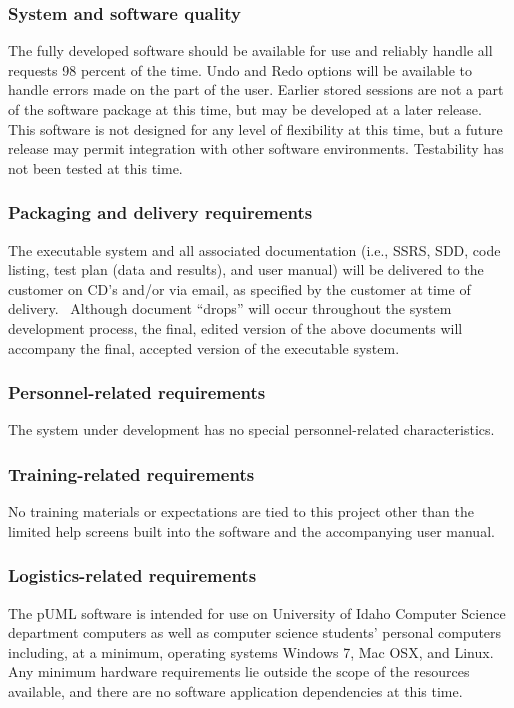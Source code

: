 \documentclass[twoside,letterpaper]{article}
\begin{document}
\subsubsection[System and software quality]{\rmfamily\bfseries System
and software quality}
{
The fully developed software should be available for use and reliably handle all requests 98 percent of the time.  
Undo and Redo options will be available to handle errors made on the part of the user.  
Earlier stored sessions are not a part of the software package at this time, but may be developed at a later release.
This software is not designed for any level of flexibility at this time, but a future release may permit
integration with other software environments. Testability has not been tested at this time.
}

\subsubsection[Packaging and delivery requirements]{\rmfamily\bfseries
Packaging and delivery requirements}
{
The executable system and all associated documentation (i.e., SSRS, SDD,
code listing, test plan (data and results), and user manual) will be
delivered to the customer on CD{\textquoteright}s and/or via email, as
specified by the customer at time of delivery. \ Although document
{\textquotedblleft}drops{\textquotedblright} will occur throughout the
system development process, the final, edited version of the above
documents will accompany the final, accepted version of the executable
system.}

\subsubsection[Personnel{}-related requirements]{\rmfamily\bfseries
Personnel-related requirements}
{
The system under development has no special personnel-related
characteristics. }

\subsubsection[Training{}-related requirements]{\rmfamily\bfseries
Training-related requirements}
{
No training materials or expectations are tied to this project other
than the limited help screens built into the software and the
accompanying user manual.}

\subsubsection[Logistics{}-related requirements]{\rmfamily\bfseries
Logistics-related requirements}
{
The pUML software is intended for use on University of Idaho Computer Science department computers as well as computer science students' personal computers including, at a minimum, operating systems Windows 7, Mac OSX, and Linux.
Any minimum hardware requirements lie outside the scope of the resources available,
and there are no software application dependencies at this time.
}
\end{document}

